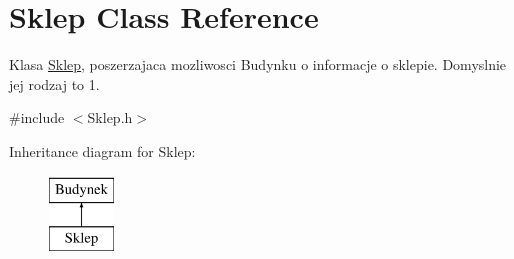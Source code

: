 \hypertarget{class_sklep}{}\section{Sklep Class Reference}
\label{class_sklep}


Klasa \hyperlink{class_sklep}{Sklep}, poszerzajaca mozliwosci Budynku o informacje o sklepie. Domyslnie jej rodzaj to 1.  




{\ttfamily \#include $<$Sklep.\+h$>$}

Inheritance diagram for Sklep\+:\begin{figure}[H]
\begin{center}
\leavevmode
\includegraphics[height=2.000000cm]{class_sklep}
\end{center}
\end{figure}
